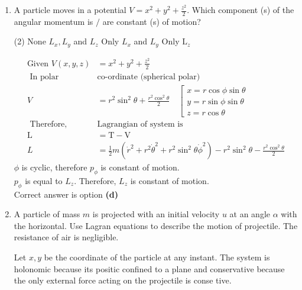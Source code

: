 \begin{enumerate}
\begin{answer}
\begin{align*}
		\therefore \mathrm{V}&=b x
		\intertext{ This is same as uniform gravitational potential. Therefore, solution must be of the form. This is same as uniform} \mathrm{S}&=\mathrm{S}_{0}+\mathrm{ut}+\frac{1}{2} \mathrm{at}^{2}
		\end{align*}
		Correct answer is option \textbf{(a)}
	\end{answer}
	\item A particle moves in a potential $V=x^{2}+y^{2}+\frac{z^{2}}{2}$. Which component (s) of the angular momentum is $/$ are constant (s) of motion?
	 \begin{tasks}(2)
		\task[\textbf{a.}]None
		\task[\textbf{b.}]$L_{x}, L_{y}$ and $L_{z}$
		\task[\textbf{c.}]Only $L_{x}$ and $L_{y}$
		\task[\textbf{d.}] Only $\mathrm{L}_{z}$
	\end{tasks}
	\begin{answer}
		\begin{align*}
		\text{Given }V(x, y, z)&=x^{2}+y^{2}+\frac{z^{2}}{2}\\
	\text{	In polar }&\text{co-ordinate (spherical polar)}\\
	V&=r^{2} \sin ^{2} \theta+\frac{r^{2} \cos ^{2} \theta}{2} \quad\left[\begin{array}{l}x=r \cos \phi \sin \theta \\ 
	y=r \sin \phi \sin \theta \\
	 z=r \cos \theta\end{array}\right.\\
\text{	Therefore, }&\text{Lagrangian of system is}\\
	\mathrm{L}&=\mathrm{T}-\mathrm{V} \\
	L&=\frac{1}{2} m\left(\dot{r}^{2}+r^{2} \dot{\theta}^{2}+r^{2} \sin ^{2} \theta \dot{\phi}^{2}\right)-r^{2} \sin ^{2} \theta-\frac{r^{2} \cos ^{2} \theta}{2}
		\end{align*}
		$\phi$ is cyclic, therefore $p_{\phi}$ is constant of motion.\\
		$p_{\phi}$ is equal to $L_{z}$. Therefore, $L_{z}$ is constant of motion.\\
		Correct answer is option \textbf{(d)}
	\end{answer}
	\item	A particle of mass $m$ is projected with an initial velocity $u$ at an angle $\alpha$ with the horizontal. Use Lagran equations to describe the motion of projectile. The resistance of air is negligible.
	\begin{answer}
			Let $x, y$ be the coordinate of the particle at any instant. The system is holonomic because its positic confined to a plane and conservative because the only external force acting on the projectile is conse tive.

\end{answer}
\end{enumerate}
